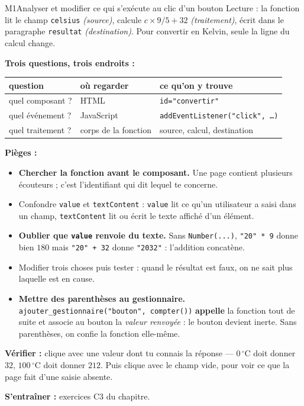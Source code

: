 \begin{fichemethode}{M1}{Analyser et modifier ce qui s'exécute au clic d'un bouton}
Lecture : la fonction lit le champ \lstinline{celsius} \emph{(source)}, calcule
$c \times 9/5 + 32$ \emph{(traitement)}, écrit dans le paragraphe \lstinline{resultat}
\emph{(destination)}. Pour convertir en Kelvin, seule la ligne du calcul change.

\textbf{Trois questions, trois endroits :}
\begin{center}
\begin{tabular}{l|l|l}
question & où regarder & ce qu'on y trouve \\
\hline
quel composant ? & HTML & \texttt{id="convertir"} \\
quel événement ? & JavaScript & \texttt{addEventListener("click", …)} \\
quel traitement ? & corps de la fonction & source, calcul, destination \\
\end{tabular}
\end{center}

\textbf{Pièges :}
\begin{itemize}
  \item \textbf{Chercher la fonction avant le composant.} Une page contient plusieurs
    écouteurs ; c'est l'identifiant qui dit lequel te concerne.
  \item Confondre \lstinline{value} et \lstinline{textContent} :
    \lstinline{value} lit ce qu'un utilisateur a saisi dans un champ,
    \lstinline{textContent} lit ou écrit le texte affiché d'un élément.
  \item \textbf{Oublier que \lstinline{value} renvoie du texte.} Sans
    \lstinline{Number(...)}, \lstinline{"20" * 9} donne bien $180$ mais
    \lstinline{"20" + 32} donne \lstinline{"2032"} : l'addition concatène.
  \item Modifier trois choses puis tester : quand le résultat est faux, on ne sait plus
    laquelle est en cause.
  \item \textbf{Mettre des parenthèses au gestionnaire.}
    \lstinline{ajouter_gestionnaire("bouton", compter())} \textbf{appelle} la fonction tout de
    suite et associe au bouton la \emph{valeur renvoyée} : le bouton devient inerte. Sans
    parenthèses, on confie la fonction elle-même.
\end{itemize}

\textbf{Vérifier :} clique avec une valeur dont tu connais la réponse — $0\,^\circ$C doit
donner $32$, $100\,^\circ$C doit donner $212$. Puis clique avec le champ vide, pour voir ce
que la page fait d'une saisie absente.

\textbf{S'entraîner :} exercices C3 du chapitre.
\end{fichemethode}
